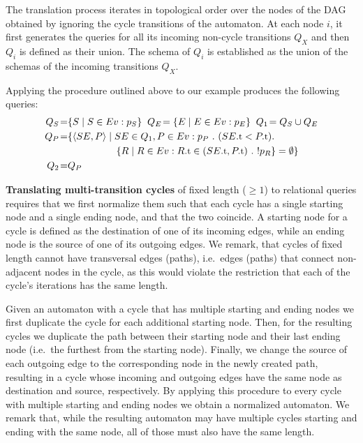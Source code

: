 The translation process iterates in topological order over the nodes of the DAG
obtained by ignoring the cycle transitions of the automaton.
At each node $i$, it first generates the queries for all its incoming
non-cycle transitions $Q_X$ and then $Q_i$ is defined as their union. 
The schema of $Q_i$ is established as the union of the schemas of the incoming 
transitions $Q_X$.

Applying the procedure outlined above to our example produces the following 
queries:
\begin{align*}
Q_S\!=& \{ S \mid S \in \Ev : p_S \}
\;\;
Q_E\!= \{ E \mid E \in \Ev : p_E \}
\;\;
Q_1\!= Q_S \cup Q_E
\\
Q_P\!=& \{ \tuple{SE,P} \mid SE \in Q_1, P \in \Ev:
p_P\ .\ (\facc{SE}{t} < \facc{P}{t}) . 
\\
& 
\qqquad\quad
\{ R \mid R \in \Ev : \facc{R}{t} \in (\facc{SE}{t}, \facc{P}{t})\ .\ 
						! p_R \} = \emptyset
 \}
\\
Q_2\!=& Q_P
\end{align*}

{\bf Translating multi-transition cycles} of fixed length 
($\geq 1$) to relational queries
requires that we first normalize them such that each cycle
has a single starting node and a single ending node, and that the two coincide.
A starting node for a cycle is defined as the destination of one of its 
incoming edges, while an ending node is the source of one of its outgoing edges.
We remark, that cycles of fixed length cannot have transversal edges (paths), 
i.e.\ edges (paths) that connect non-adjacent nodes in the cycle, as this would 
violate the restriction that each of the cycle's iterations has the same length.


Given an automaton with a cycle that has multiple starting and ending nodes 
we first duplicate the cycle for each additional starting node. 
Then, for the resulting cycles we duplicate the path between their starting 
node and their last ending node (i.e.\ the furthest from the starting node).  
Finally, we change the source of each outgoing edge to the corresponding 
node in the newly created path, resulting in a cycle whose incoming and 
outgoing edges have the same node as destination and source, respectively.
By applying this procedure to every cycle with multiple starting and ending 
nodes we obtain a normalized automaton.  
We remark that, while the resulting automaton may have multiple cycles starting 
and ending with the same node, all of those must also have the same length.


